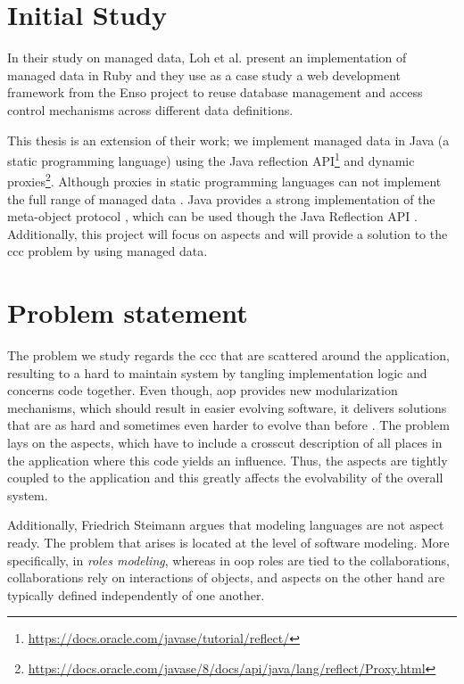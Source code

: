 \section{Initial Study}\label{Initial Study}
In their study on managed data, Loh et al. \cite{loh2012managed} present an implementation of managed data
in Ruby and they use as a case study a web development framework from the Enso project to reuse database management and 
access control mechanisms across different data definitions.

This thesis is an extension of their work; we implement managed data in Java (a static programming language) using the Java reflection API\footnote{\url{https://docs.oracle.com/javase/tutorial/reflect/}} and dynamic proxies\footnote{\url{https://docs.oracle.com/javase/8/docs/api/java/lang/reflect/Proxy.html}}. 
Although proxies in static programming languages can not implement the full range of managed data \cite{loh2012managed}. 
Java provides a strong implementation of the meta-object protocol \cite{kiczales1991art}, which can be used though the Java Reflection API \cite{forman2004java}. 
Additionally, this project will focus on aspects and will provide a solution to the \ac{ccc} problem by using managed data.

\section{Problem statement}\label{Problem statement}
The problem we study regards the \ac{ccc} that are scattered around the application, resulting to a hard to maintain system 
by tangling implementation logic and concerns code together.
Even though, \ac{aop} provides new modularization mechanisms, which should result in easier evolving software, 
it delivers solutions that are as hard and sometimes even harder to evolve than before \cite{tourwe2003existence}. 
The problem lays on the aspects, which have to include a crosscut description of all places in the application where this code yields an influence. 
Thus, the aspects are tightly coupled to the application and this greatly affects the evolvability of the overall system. 

Additionally, Friedrich Steimann \cite{steimann2005domain} argues that modeling languages are not aspect ready. 
The problem that arises is located at the level of software modeling. 
More specifically, in \textit{roles modeling}, whereas in \ac{oop} roles are tied to the collaborations,
collaborations rely on interactions of objects, and aspects on the other hand are typically defined independently of one another. 

